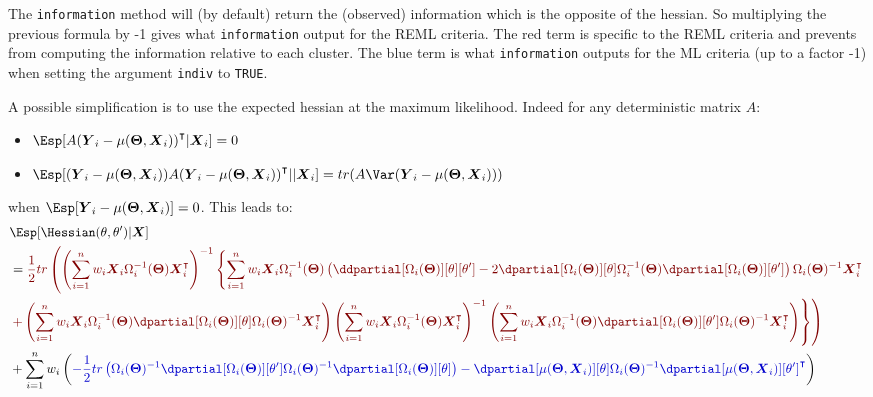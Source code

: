 \documentclass[12pt]{article}
\newcommand{\darkblue}{blue!80!black}
\newcommand{\darkred}{red!50!black}
\newcommand\trans[1]{{#1}^\intercal}%
\newcommand{\param}{\Theta}
\newcommand{\Vparam}{\boldsymbol{\param}}
\newcommand{\VX}{\boldsymbol{X}}
\newcommand{\VY}{\boldsymbol{Y}}
\begin{document}
\bigskip

The \texttt{information} method will (by default) return the (observed)
information which is the opposite of the hessian. So multiplying the
previous formula by -1 gives what \texttt{information} output for the REML
criteria. The red term is specific to the REML criteria and prevents
from computing the information relative to each cluster. The blue term
is what \texttt{information} outputs for the ML criteria (up to a factor -1)
when setting the argument \texttt{indiv} to \texttt{TRUE}.

\bigskip

A possible simplification is to use the expected hessian at the maximum likelihood. Indeed for
any deterministic matrix \(A\):
\begin{itemize}
\item \(\Esp[A \trans{(\VY_i-\mu(\Vparam,\VX_i))}|\VX_i] = 0\)
\item \(\Esp[(\VY_i-\mu(\Vparam,\VX_i)) A \trans{(\VY_i-\mu(\Vparam,\VX_i))}||\VX_i] = tr(A \Var(\VY_i-\mu(\Vparam,\VX_i)))\)
\end{itemize}
when \(\Esp[\VY_i-\mu(\Vparam,\VX_i)]=0\). This leads to:
\begin{align}
 & \Esp[\Hessian(\theta,\theta^{\prime})|\VX] \notag\\ 
 &= \textcolor{\darkred}{ \frac{1}{2} tr \left( \left(\sum_{i=1}^n w_i \VX_i \Omega_i^{-1}(\Vparam) \trans{\VX}_i\right)^{-1}  \left\{ \sum_{i=1}^n w_i \VX_i \Omega_i^{-1}(\Vparam) \left( \ddpartial[\Omega_i(\Vparam)][\theta][\theta^{\prime}] - 2 \dpartial[\Omega_i(\Vparam)][\theta]  \Omega_i^{-1}(\Vparam) \dpartial[\Omega_i(\Vparam)][\theta^{\prime}]\right) \Omega_i(\Vparam)^{-1} \trans{\VX}_i \right.  \right.} \notag \\
 & \textcolor{\darkred}{ \left. \left. +  \left(\sum_{i=1}^n w_i \VX_i \Omega_i^{-1}(\Vparam) \dpartial[\Omega_i(\Vparam)][\theta] \Omega_i(\Vparam)^{-1} \trans{\VX}_i\right) \left(\sum_{i=1}^n w_i \VX_i \Omega_i^{-1}(\Vparam) \trans{\VX}_i \right)^{-1} \left(\sum_{i=1}^n w_i \VX_i \Omega_i^{-1}(\Vparam) \dpartial[\Omega_i(\Vparam)][\theta^{\prime}] \Omega_i(\Vparam)^{-1} \trans{\VX}_i\right) \right\} \right) } \notag\\
 & + \sum_{i=1}^n w_i \left( \textcolor{\darkblue}{
- \frac{1}{2} tr\left(\Omega_i(\Vparam)^{-1} \dpartial[\Omega_i(\Vparam)][\theta^{\prime}] \Omega_i(\Vparam)^{-1} \dpartial[\Omega_i(\Vparam)][\theta]\right)
 - \dpartial[\mu(\Vparam,\VX_i)][\theta] \Omega_i(\Vparam)^{-1} \trans{\dpartial[\mu(\Vparam,\VX_i)][\theta^{\prime}]}
 } \right) \label{eq:expectedInfo}
\end{align}
\end{document}
